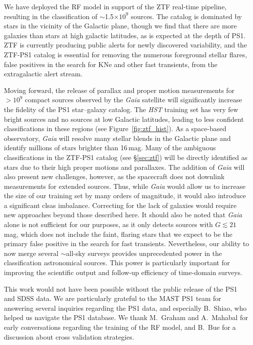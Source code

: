 \documentclass[twocolumn, dvipdfmx]{aastex62}
\begin{document}
We have deployed the RF model in support of the ZTF real-time pipeline,
resulting in the classification of $\sim$1.5$\times 10^{9}$ sources. The
catalog is dominated by stars in the vicinity of the Galactic plane, though
we find that there are more galaxies than stars at high galactic latitudes,
as is expected at the depth of PS1. ZTF is currently producing public alerts
for newly discovered variability, and the ZTF-PS1 catalog is essential for
removing the numerous foreground stellar flares, false positives in the
search for KNe and other fast transients, from the extragalactic alert
stream.

Moving forward, the release of parallax and proper motion measurements for
$> 10^{9}$ compact sources observed by the \textit{Gaia} satellite
\citep{GaiaDR2} will significantly increase the fidelity of the PS1
star--galaxy catalog. The \textit{HST} training set has very few bright
sources and no sources at low Galactic latitudes, leading to less confident
classifications in these regions (see Figure~\ref{fig:ztf_hist}). As a
space-based observatory, \textit{Gaia} will resolve many stellar blends in
the Galactic plane and identify millions of stars brighter than 16\,mag.
Many of the ambiguous classifications in the ZTF-PS1 catalog (see
\S\ref{sec:ztf}) will be directly identified as stars due to their high
proper motions and parallaxes. The addition of \textit{Gaia} will also
present new challenges, however, as the spacecraft does not downlink
measurements for extended sources. Thus, while \textit{Gaia} would allow us
to increase the size of our training set by many orders of magnitude, it
would also introduce a significant clsas imbalance. Correcting for the lack
of galaxies would require new approaches beyond those described here. It
should also be noted that \textit{Gaia} alone is not sufficient for our
purposes, as it only detects sources with $G \lesssim 21$\,mag, which does
not include the faint, flaring stars that we expect to be the primary false
positive in the search for fast transients. Nevertheless, our ability to now
merge several $\sim$all-sky surveys provides unprecedented power in the
classification astronomical sources. This power is particularly important
for improving the scientific output and follow-up efficiency of time-domain
surveys.

\acknowledgements

This work would not have been possible without the public release of the PS1
and SDSS data. We are particularly grateful to the MAST PS1 team for
answering several inquiries regarding the PS1 data, and especially B.~Shiao,
who helped us navigate the PS1 database. We thank M.~Graham and A.~Mahabal
for early conversations regarding the training of the RF model, and B.~Bue
for a discussion about cross validation strategies.
\end{document}

